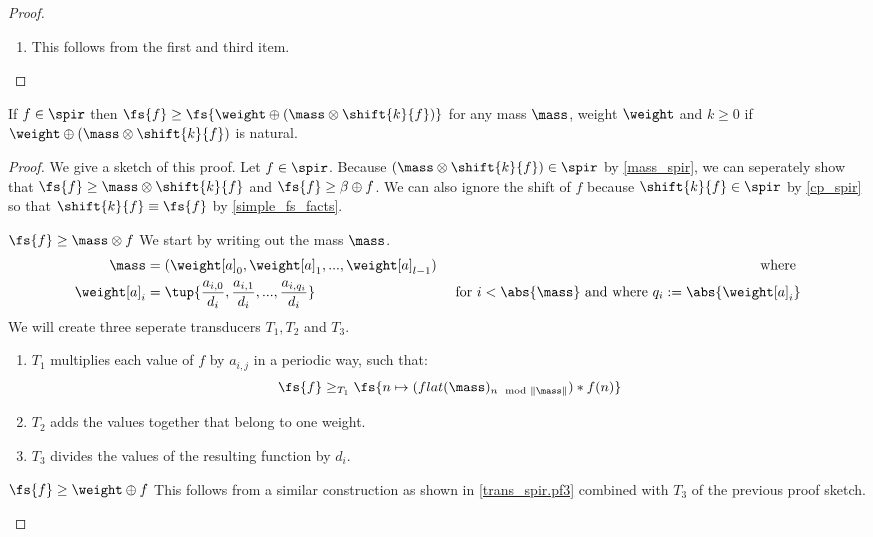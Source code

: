 \begin{proposition}
\begin{proof}
\begin{enumerate}
			\begin{align*}
				\mass \otimes f = \fzip_{l}(g_0,g_1,\dots, g_{l-1}) \qquad\text{ where }\qquad g_i = ((\mass[b]_i) \otimes f) \text{ for } i<l
			\end{align*}
			for positive weights $\mass[b]_i$. In the previous item, we have seen that $g_i\in\spir$ for all $i<l$. The result follows from the fact that $\fzip$ is spiralling when all its arguments are spiralling as shown in \cref{\fzip_spir}.
			\item This follows from the first and third item.
		\end{enumerate}
	\end{proof}
\end{proposition}

\begin{lemma}{\cite{streams:degrees:squares:2015}}\label{f_transto_massprod}
	If $f\in\spir$ then $\fs{f} \geq \fs{\weight \oplus (\mass \otimes \shift{k}{f})}$ for any mass $\mass$, weight $\weight$ and $k\geq0$ if $\weight \oplus (\mass \otimes \shift{k}{f})$ is natural.
	\begin{proof}
		We give a sketch of this proof. 
		Let $f\in\spir$.
		Because $(\mass \otimes \shift{k}{f}) \in \spir$ by \cref{mass_spir}, we can seperately show that $\fs{f} \geq \mass \otimes \shift{k}{f}$ and $\fs{f} \geq \beta \oplus f$. We can also ignore the shift of $f$ because $\shift{k}{f}\in\spir$ by \cref{cp_spir} so that $\shift{k}{f} \equiv \fs{f}$ by \cref{simple_fs_facts}. \\
		\begin{stp}{$\fs{f} \geq \mass \otimes f$}
			We start by writing out the mass $\mass$.
			\begin{align*}
				\mass &= (\weight[a]_0,\weight[a]_1,..., \weight[a]_{l-1}) &\text{ where } \\
				\weight[a]_i &= \tup{\frac{a_{i,0}}{d_i},\frac{a_{i,1}}{d_i},...,\frac{a_{i,q_i}}{d_i}} &\text{ for } i < \abs{\mass} \text{ and where }
				q_i := \abs{\weight[a]_i}
			\end{align*}
			We will create three seperate transducers $T_1,T_2$ and $T_3$.
			\begin{enumerate}
				\item $T_1$ multiplies each value of $f$ by $a_{i,j}$ in a periodic way, such that:
				$$\fs{f} \geq_{T_1} \fs{n \mapsto (flat(\mass)_{n\mod \|\mass \|})*f(n)}$$
				\item $T_2$ adds the values together that belong to one weight. 
				\item $T_3$ divides the values of the resulting function by $d_i$.
			\end{enumerate}
		\end{stp}
		\begin{stp}{$\fs{f} \geq \weight \oplus f$}
			This follows from a similar construction as shown in \cref{trans_spir.pf3} combined with $T_3$ of the previous proof sketch. 
		\end{stp}
	\end{proof}
\end{lemma}
